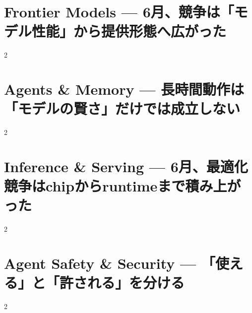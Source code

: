 \documentclass[lualatex,a4paper,11pt]{jlreq}
\begin{document}
\surveycover
\clearpage


\clearpage
\section{Frontier Models — 6月、競争は「モデル性能」から提供形態へ広がった}
\label{pkg:frontier-models-june}
\vspace{0.15em}
\begin{multicols}{2}

\end{multicols}
\Needspace{0.34\textheight}

\medskip


\clearpage
\section{Agents \& Memory — 長時間動作は「モデルの賢さ」だけでは成立しない}
\label{pkg:agents-memory-june}
\vspace{0.15em}
\begin{multicols}{2}

\end{multicols}
\Needspace{0.34\textheight}

\medskip


\clearpage
\section{Inference \& Serving — 6月、最適化競争はchipからruntimeまで積み上がった}
\label{pkg:inference-serving-june}
\vspace{0.15em}
\begin{multicols}{2}

\end{multicols}
\Needspace{0.34\textheight}

\medskip


\clearpage
\section{Agent Safety \& Security — 「使える」と「許される」を分ける}
\label{pkg:agent-safety-security-june}
\vspace{0.15em}
\begin{multicols}{2}

\end{multicols}
\Needspace{0.34\textheight}

\medskip

\end{document}

